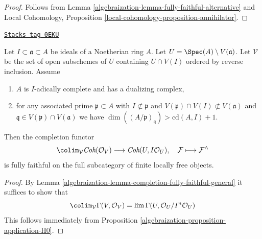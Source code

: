 \begin{proof}

Follows from Lemma \ref{algebraization-lemma-fully-faithful-alternative} and
Local Cohomology, Proposition \ref{local-cohomology-proposition-annihilator}.
\end{proof}

\begin{lemma}
\label{algebraization-lemma-fully-faithful-general}
\href{https://stacks.math.columbia.edu/tag/0EKU}{\texttt{Stacks tag 0EKU}}

Let $I \subset \mathfrak a \subset A$ be ideals of a Noetherian ring $A$.
Let $U = \Spec(A) \setminus V(\mathfrak a)$. Let $\mathcal{V}$ be
the set of open subschemes of $U$ containing $U \cap V(I)$
ordered by reverse inclusion. Assume
\begin{enumerate}
\item $A$ is $I$-adically complete and has a dualizing complex,
\item for any associated prime
$\mathfrak p \subset A$ with
$I \not \subset \mathfrak p$ and
$V(\mathfrak p) \cap V(I) \not \subset V(\mathfrak a)$
and $\mathfrak q \in V(\mathfrak p) \cap V(\mathfrak a)$ we have
$\dim((A/\mathfrak p)_\mathfrak q) > \text{cd}(A, I) + 1$.
\end{enumerate}
Then the completion functor
$$
\colim_\mathcal{V} \textit{Coh}(\mathcal{O}_V)
\longrightarrow
\textit{Coh}(U, I\mathcal{O}_U),
\quad
\mathcal{F} \longmapsto \mathcal{F}^\wedge
$$
is fully faithful on the full subcategory of
finite locally free objects.
\end{lemma}

\begin{proof}

By Lemma \ref{algebraization-lemma-completion-fully-faithful-general}
it suffices to show that
$$
\colim_\mathcal{V} \Gamma(V, \mathcal{O}_V) =
\lim \Gamma(U, \mathcal{O}_U/I^n\mathcal{O}_U)
$$
This follows immediately from Proposition \ref{algebraization-proposition-application-H0}.
\end{proof}

